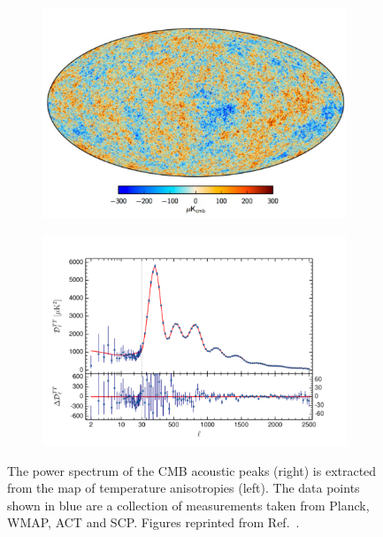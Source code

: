 \begin{figure}[!ht]
     \centering
     \begin{subfigure}{0.47\textwidth}
         \centering
         \includegraphics[width=\textwidth]{figures/DMOverview/CMBImg.png}
         \caption{}
         \label{fig:DMOverview/CMBImg}
     \end{subfigure}
     \hfill
     \begin{subfigure}{0.47\textwidth}
         \centering
         \includegraphics[width=\textwidth]{figures/DMOverview/CMBPS.png}
         \caption{}
         \label{fig:DMOverview/CMBPowerSpec}
     \end{subfigure}
     \caption{The power spectrum of the CMB acoustic peaks (right) is extracted from the map of temperature anisotropies (left). The data points shown in blue are a collection of measurements taken from Planck, WMAP, ACT and SCP. Figures reprinted from Ref.~\cite{Cirelli:2024ssz}.}
     \label{fig:DMOverview/CMB}
\end{figure}
